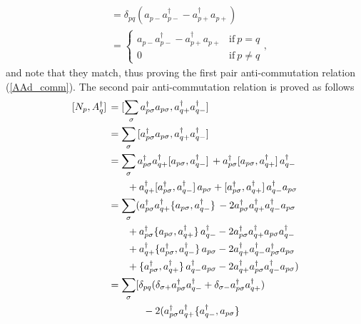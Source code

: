 \documentclass[Dual]{msu-thesis}
\begin{document}
\begin{appendices}
\begin{align}
\\
&=
\delta_{pq}(a_{p-}a^\dagger_{p-}-a^\dagger_{p+}a_{p+})
\\
&=
\begin{cases}
a_{p-}a^\dagger_{p-}-a^\dagger_{p+}a_{p+} & \text{if} \ p=q
\\
0 & \text{if} \ p\neq q
\end{cases},
\end{align}
and note that they match, thus proving the first pair anti-commutation relation (\ref{AAd_comm}). The second pair anti-commutation relation is proved as follows
\begin{align}
\comm*{N_p}{A^\dagger_q}
&=
\comm*{\sum_\sigma a^\dagger_{p\sigma}a_{p\sigma}}{a^\dagger_{q+}a^\dagger_{q-}}
\\
&=
\sum_\sigma
\comm*{a^\dagger_{p\sigma}a_{p\sigma}}{a^\dagger_{q+}a^\dagger_{q-}}
\\
&=
\sum_\sigma 
a^\dagger_{p\sigma}a^\dagger_{q+}\comm*{a_{p\sigma}}{a^\dagger_{q-}}
+
a^\dagger_{p\sigma}\comm*{a_{p\sigma}}{a^\dagger_{q+}}a^\dagger_{q-}
\nonumber
\\
& \hspace{6.6mm}+
a^\dagger_{q+}\comm*{a^\dagger_{p\sigma}}{a^\dagger_{q-}}a_{p\sigma}
+
\comm*{a^\dagger_{p\sigma}}{a^\dagger_{q+}}a^\dagger_{q-}a_{p\sigma}
\\
&=
\sum_\sigma
(
a^\dagger_{p\sigma}a^\dagger_{q+}\acomm*{a_{p\sigma}}{a^\dagger_{q-}}
-2
a^\dagger_{p\sigma}a^\dagger_{q+}a^\dagger_{q-}a_{p\sigma}
\nonumber
\\
& \hspace{6.6mm} +
a^\dagger_{p\sigma}\acomm*{a_{p\sigma}}{a^\dagger_{q+}}a^\dagger_{q-}
-2
a^\dagger_{p\sigma}a^\dagger_{q+}a_{p\sigma}a^\dagger_{q-}
\nonumber
\\
& \hspace{6.6mm} +
a^\dagger_{q+}\acomm*{a^\dagger_{p\sigma}}{a^\dagger_{q-}}a_{p\sigma}
-2
a^\dagger_{q+}a^\dagger_{q-}a^\dagger_{p\sigma}a_{p\sigma}
\nonumber
\\
& \hspace{6.6mm} +
\acomm*{a^\dagger_{p\sigma}}{a^\dagger_{q+}}a^\dagger_{q-}a_{p\sigma}
-2
a^\dagger_{q+}a^\dagger_{p\sigma}a^\dagger_{q-}a_{p\sigma}
)
\\
&=
\sum_\sigma 
[
\delta_{pq}(
\delta_{\sigma+}a^\dagger_{p\sigma}a^\dagger_{q-}
+
\delta_{\sigma-}a^\dagger_{p\sigma}a^\dagger_{q+}
)
\nonumber
\\
& \hspace{12.25mm} -2
(
a^\dagger_{p\sigma}a^\dagger_{q+}\acomm*{a^\dagger_{q-}}{a_{p\sigma}}

\end{align}
\end{appendices}
\end{document}
